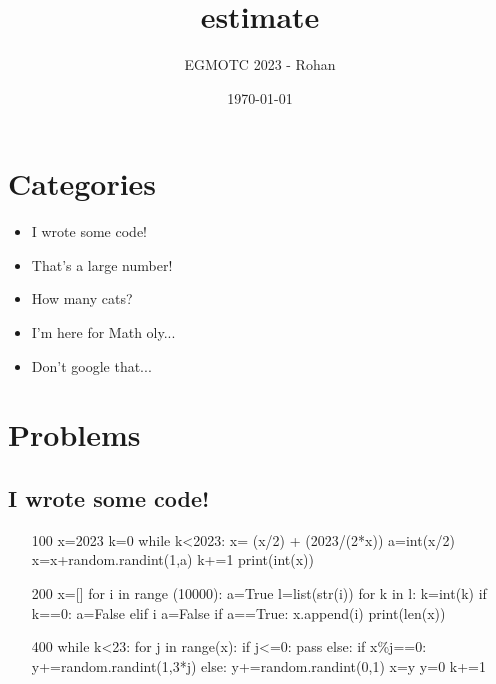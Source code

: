 \documentclass[12pt]{article}
\title{estimate}
\author{EGMOTC 2023 - Rohan}
\date{\today}
\begin{document}
\maketitle

\newcommand{\localtextbulletone}{\textcolor{black}{\raisebox{.45ex}{\rule{.6ex}{.6ex}}}}
\renewcommand{\labelitemi}{\localtextbulletone}

\newtheorem{definition}{Definition}
\newtheorem{theorem}{Theorem}
\newtheorem{corollary}{Corollary}

\thispagestyle{empty}

\section*{Categories}
\begin{itemize}
    \item I wrote some code!
    \item That's a large number!
    \item How many cats?
    \item I'm here for Math oly...
    \item Don't google that...
\end{itemize}

\eject

\section*{Problems}

\subsection*{I wrote some code!}

\begin{enumerate}
    \item [100] x=2023
    k=0
    while k<2023:
        x= (x/2) + (2023/(2*x))
        a=int(x/2)
        x=x+random.randint(1,a)
        k+=1
    print(int(x))
    
    \item [200] x=[]
    for i in range (10000):
        a=True
        l=list(str(i))
        for k in l:
            k=int(k)
            if k==0:
                a=False
            elif i%
                a=False
        if a==True:
            x.append(i)
    print(len(x)) %
    \item [400] 
    while k<23:
    for j in range(x):
        if j<=0:
            pass
        else:
            if x\%j==0:
                y+=random.randint(1,3*j)
            else:
                y+=random.randint(0,1)
    x=y
    y=0
    k+=1 
\end{enumerate}
\end{document}

